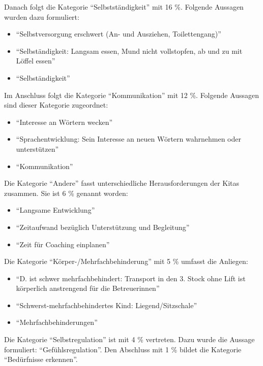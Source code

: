 \documentclass[
  ngerman,
  11pt,
  paper=a4,
  twoside,
  titlepage=true,
  openright,
  abstract=on,
  toc=listofnumbered,
  numbers=noenddot,
  chapterprefix=true,
  headings=optiontohead,
  svgnames,
  dvipsnames]{scrreprt}
\providecommand{\tightlist}{%
  \setlength{\itemsep}{0pt}\setlength{\parskip}{0pt}}
\begin{document}
Danach folgt die Kategorie “Selbstständigkeit” mit 16 \%. Folgende
Aussagen wurden dazu formuliert:

\begin{itemize}
\tightlist
\item
  “Selbstversorgung erschwert (An- und Ausziehen, Toilettengang)”
\item
  “Selbständigkeit: Langsam essen, Mund nicht vollstopfen, ab und zu mit
  Löffel essen”
\item
  “Selbständigkeit”
\end{itemize}

Im Anschluss folgt die Kategorie “Kommunikation” mit 12 \%. Folgende
Aussagen sind dieser Kategorie zugeordnet:

\begin{itemize}
\tightlist
\item
  “Interesse an Wörtern wecken”
\item
  “Sprachentwicklung: Sein Interesse an neuen Wörtern wahrnehmen oder
  unterstützen”
\item
  “Kommunikation”
\end{itemize}

Die Kategorie “Andere” fasst unterschiedliche Herausforderungen der
Kitas zusammen. Sie ist 6 \% genannt worden:

\begin{itemize}
\tightlist
\item
  “Langsame Entwicklung”
\item
  “Zeitaufwand bezüglich Unterstützung und Begleitung”
\item
  “Zeit für Coaching einplanen”
\end{itemize}

Die Kategorie “Körper-/Mehrfachbehinderung” mit 5 \% umfasst die
Anliegen:

\begin{itemize}
\tightlist
\item
  “D. ist schwer mehrfachbehindert: Transport in den 3. Stock ohne Lift
  ist körperlich anstrengend für die Betreuerinnen”
\item
  “Schwerst-mehrfachbehindertes Kind: Liegend/Sitzschale”
\item
  “Mehrfachbehinderungen”
\end{itemize}

Die Kategorie “Selbstregulation” ist mit 4 \% vertreten. Dazu wurde die
Aussage formuliert: “Gefühlsregulation”. Den Abschluss mit 1 \% bildet
die Kategorie “Bedürfnisse erkennen”.
\end{document}

